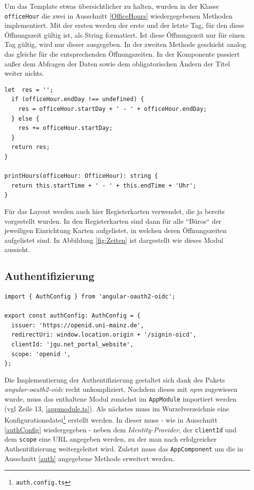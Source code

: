 Um das Template etwas übersichtlicher zu halten, wurden in der Klasse \texttt{officeHour} die zwei in Ausschnitt \ref{OfficeHours} wiedergegebenen Methoden implementiert. Mit der ersten werden der erste und der letzte Tag, für den diese Öffnungszeit gültig ist, als String formatiert. Ist diese Öffnungszeit nur für einen Tag gültig, wird nur dieser ausgegeben. In der zweiten Methode geschieht analog das gleiche für die entsprechenden Öffnungszeiten. In der Komponente passiert außer dem Abfragen der Daten sowie dem obligatorischen Ändern der Titel weiter nichts.

\begin{lstlisting}[float, floatplacement=h, style=htmlcssjs, caption={Ausschnitt aus der Klasse \texttt{OfficeHour}}, label={OfficeHours}]
  let  res = '';
  if (officeHour.endDay !== undefined) {
    res = officeHour.startDay + ' - ' + officeHour.endDay;
  } else {
    res += officeHour.startDay;
  }
  return res;
}

printHours(officeHour: OfficeHour): string {
  return this.startTime + ' - ' + this.endTime + 'Uhr';
}
\end{lstlisting}
Für das Layout werden auch hier Registerkarten verwendet, die ja bereits vorgestellt wurden. In den Registerkarten sind dann für alle ``Büros`` der jeweiligen Einrichtung Karten aufgelistet, in welchen deren Öffnungszeiten aufgelistet sind. In Abbildung \ref{fig:Zeiten} ist dargestellt wie dieses Modul aussieht.
\subsection{Authentifizierung}
\label{sec:prog:auth}

\begin{lstlisting}[float, floatplacement=h, style=htmlcssjs, caption={Konfiguration für die Authentifizierung}, label={authConfig}]
import { AuthConfig } from 'angular-oauth2-oidc';

export const authConfig: AuthConfig = {
  issuer: 'https://openid.uni-mainz.de',
  redirectUri: window.location.origin + '/signin-oicd',
  clientId: 'jgu.net_portal_website',
  scope: 'openid ',
};
\end{lstlisting}
Die Implementierung der Authentifizierung gestaltet sich dank des Pakets \textit{angular-oauth2-oidc} recht unkompliziert. Nachdem dieses mit \textit{npm} zugewiesen wurde, muss das enthaltene Modul zunächst im \texttt{AppModule} importiert werden (vgl Zeile 13, \ref{appmodule.ts}). Als nächstes muss im Wurzelverzeichnis eine Konfigurationsdatei\footnote{\texttt{auth.config.ts}} erstellt werden. In dieser muss - wie in Ausschnitt \ref{authConfig} wiedergegeben - neben dem \textit{Identity-Provider}, der \texttt{clientId} und dem \texttt{scope} eine \acs{URL} angegeben werden, zu der man nach erfolgreicher Authentifizierung weitergeleitet wird. Zuletzt muss das \texttt{AppComponent} um die in Ausschnitt \ref{auth} angegebene Methode erweitert werden.

